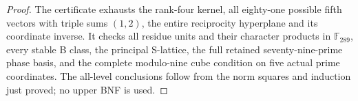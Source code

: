 \begin{proof}
The certificate exhausts the rank-four kernel, all eighty-one
possible fifth vectors with triple sums \((1,2)\), the entire
reciprocity hyperplane and its coordinate inverse. It checks
all residue units and their character products in
\(\mathbb F_{289}\), every stable B class, the principal S-lattice,
the full retained seventy-nine-prime phase basis, and the
complete modulo-nine cube condition on five actual prime
coordinates. The all-level conclusions follow from the norm
squares and induction just proved; no upper BNF is used.
\end{proof}
